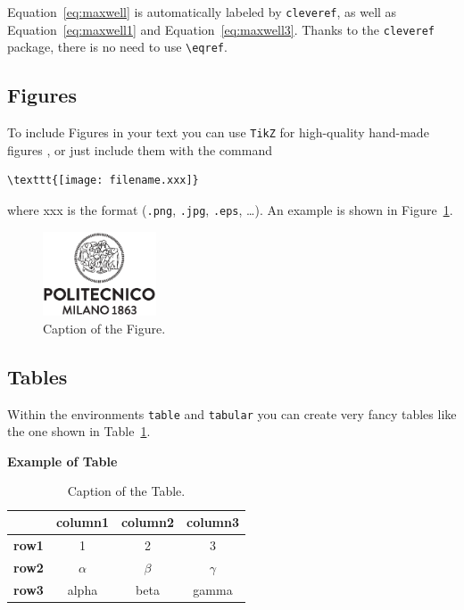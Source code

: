 \documentclass[11pt,a4paper,twocolumn]{article}
\begin{document}
Equation~\eqref{eq:maxwell} is automatically labeled by \texttt{cleveref},
as well as Equation~\eqref{eq:maxwell1} and Equation~\eqref{eq:maxwell3}.
Thanks to the \verb|cleveref| package, there is no need to use \verb|\eqref|.

\subsection{Figures}
\label{sec:figures}
To include Figures in your text you can use \texttt{TikZ} for high-quality hand-made figures \cite{tikz},
or just include them with the command
\begin{verbatim}
\texttt{[image: filename.xxx]}
\end{verbatim}
where xxx is the format (\verb|.png|, \verb|.jpg|, \verb|.eps|, \dots).
An example is shown in Figure~\ref{fig:quadtree}.
\begin{figure}[H]
    \centering
    \includegraphics[width=0.3\textwidth]{logo_polimi_scritta.eps}
    \caption{Caption of the Figure.}
    \label{fig:quadtree}
\end{figure}

\subsection{Tables}
\label{subsec:tables}

Within the environments \texttt{table} and  \texttt{tabular} you can create very fancy tables like the one shown in Table~\ref{table:example}.
\begin{table}[H]
    \caption*{\textbf{Example of Table}}
    \centering 
    \begin{tabular}{|p{3em} c c c |}
    \hline
    \rowcolor{bluePoli!40}
     & \textbf{column1} & \textbf{column2} & \textbf{column3} \T\B \\
    \hline \hline
    \textbf{row1} & 1 & 2 & 3 \T\B \\
    \textbf{row2} & $\alpha$ & $\beta$ & $\gamma$ \T\B\\
    \textbf{row3} & alpha & beta & gamma \B\\
    \hline
    \end{tabular}
    \\[10pt]
    \caption{Caption of the Table.}
    \label{table:example}
\end{table}
\end{document}
